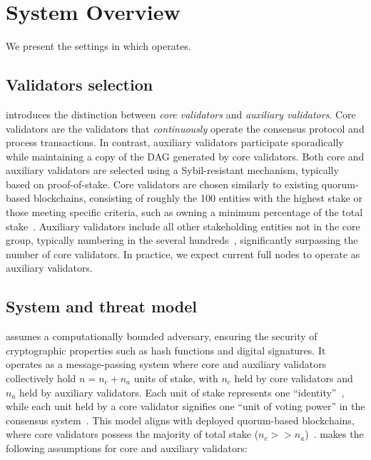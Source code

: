 \section{System Overview} \label{sec:overview}

We present the settings in which \sysname operates.

\subsection{Validators selection} \label{sec:validators}
\sysname introduces the distinction between \emph{core validators} and \emph{auxiliary validators}. Core validators are the validators that \emph{continuously} operate the consensus protocol and process transactions. In contrast, auxiliary validators participate sporadically while maintaining a copy of the DAG generated by core validators.
Both core and auxiliary validators are selected using a Sybil-resistant mechanism, typically based on proof-of-stake. Core validators are chosen similarly to existing quorum-based blockchains, consisting of roughly the 100 entities with the highest stake or those meeting specific criteria, such as owning a minimum percentage of the total stake~\cite{sui}.  Auxiliary validators include all other stakeholding entities not in the core group, typically numbering in the several hundreds~\cite{sui-scan}, significantly surpassing the number of core validators.  In practice, we expect current full nodes to operate as auxiliary validators.

\subsection{System and threat model} \label{sec:model}
\sysname assumes a computationally bounded adversary, ensuring the security of cryptographic properties such as hash functions and digital signatures. It operates as a message-passing system where core and auxiliary validators collectively hold  $n = n_c + n_a$ units of stake, with $n_c$ held by core validators and $n_a$ held by auxiliary validators. Each unit of stake represents one ``identity''~\cite{douceur2002sybil}, while each unit held by a core validator signifies one ``unit of voting power'' in the consensus system~\cite{sui-code,sui}. This model aligns with deployed quorum-based blockchains, where core validators possess the majority of total stake ($n_c >> n_a$)~\cite{sui,aptos,solana}. \sysname makes the following assumptions for core and auxiliary validators:

